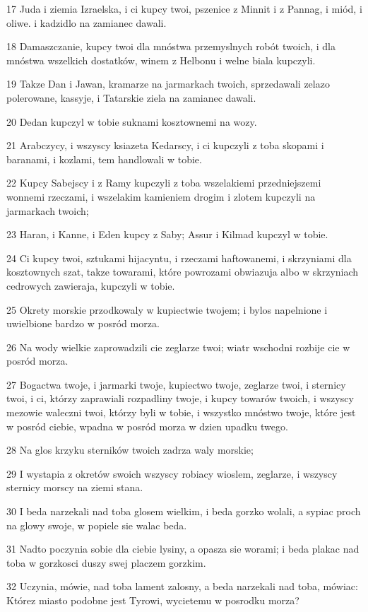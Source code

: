 \par 17 Juda i ziemia Izraelska, i ci kupcy twoi, pszenice z Minnit i z Pannag, i miód, i oliwe. i kadzidlo na zamianec dawali.
\par 18 Damaszczanie, kupcy twoi dla mnóstwa przemyslnych robót twoich, i dla mnóstwa wszelkich dostatków, winem z Helbonu i welne biala kupczyli.
\par 19 Takze Dan i Jawan, kramarze na jarmarkach twoich, sprzedawali zelazo polerowane, kassyje, i Tatarskie ziela na zamianec dawali.
\par 20 Dedan kupczyl w tobie suknami kosztownemi na wozy.
\par 21 Arabczycy, i wszyscy ksiazeta Kedarscy, i ci kupczyli z toba skopami i baranami, i kozlami, tem handlowali w tobie.
\par 22 Kupcy Sabejscy i z Ramy kupczyli z toba wszelakiemi przedniejszemi wonnemi rzeczami, i wszelakim kamieniem drogim i zlotem kupczyli na jarmarkach twoich;
\par 23 Haran, i Kanne, i Eden kupcy z Saby; Assur i Kilmad kupczyl w tobie.
\par 24 Ci kupcy twoi, sztukami hijacyntu, i rzeczami haftowanemi, i skrzyniami dla kosztownych szat, takze towarami, które powrozami obwiazuja albo w skrzyniach cedrowych zawieraja, kupczyli w tobie.
\par 25 Okrety morskie przodkowaly w kupiectwie twojem; i bylos napelnione i uwielbione bardzo w posród morza.
\par 26 Na wody wielkie zaprowadzili cie zeglarze twoi; wiatr wschodni rozbije cie w posród morza.
\par 27 Bogactwa twoje, i jarmarki twoje, kupiectwo twoje, zeglarze twoi, i sternicy twoi, i ci, którzy zaprawiali rozpadliny twoje, i kupcy towarów twoich, i wszyscy mezowie waleczni twoi, którzy byli w tobie, i wszystko mnóstwo twoje, które jest w posród ciebie, wpadna w posród morza w dzien upadku twego.
\par 28 Na glos krzyku sterników twoich zadrza waly morskie;
\par 29 I wystapia z okretów swoich wszyscy robiacy wioslem, zeglarze, i wszyscy sternicy morscy na ziemi stana.
\par 30 I beda narzekali nad toba glosem wielkim, i beda gorzko wolali, a sypiac proch na glowy swoje, w popiele sie walac beda.
\par 31 Nadto poczynia sobie dla ciebie lysiny, a opasza sie worami; i beda plakac nad toba w gorzkosci duszy swej placzem gorzkim.
\par 32 Uczynia, mówie, nad toba lament zalosny, a beda narzekali nad toba, mówiac: Którez miasto podobne jest Tyrowi, wycietemu w posrodku morza?
